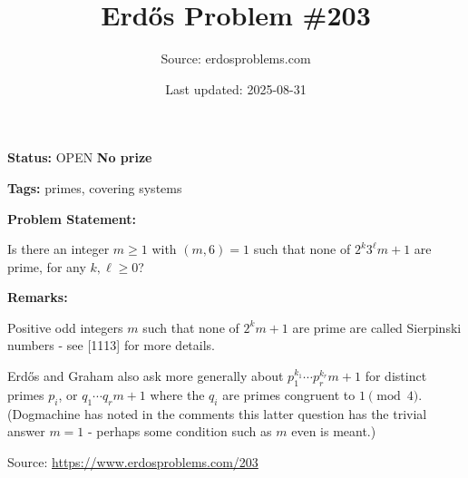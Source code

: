 \documentclass{article}
\title{Erd\H{o}s Problem \#203}
\date{Last updated: 2025-08-31}
\author{Source: erdosproblems.com}
\begin{document}
\maketitle

\noindent\textbf{Status:} OPEN \quad \textbf{No prize}

\noindent\textbf{Tags:} primes, covering systems

\medskip
\noindent\textbf{Problem Statement:}

Is there an integer $m\geq 1$ with $(m,6)=1$ such that none of $2^k3^\ell m+1$ are prime, for any $k,\ell\geq 0$?

\bigskip
\noindent\textbf{Remarks:}

Positive odd integers $m$ such that none of $2^km+1$ are prime are called Sierpinski numbers - see [1113] for more details.

Erd\H{o}s and Graham also ask more generally about $p_1^{k_1}\cdots p_r^{k_r}m+1$ for distinct primes $p_i$, or $q_1\cdots q_rm+1$ where the $q_i$ are primes congruent to $1\pmod{4}$. (Dogmachine has noted in the comments this latter question has the trivial answer $m=1$ - perhaps some condition such as $m$ even is meant.)

\bigskip
\noindent\small{Source: \url{https://www.erdosproblems.com/203}}
\end{document}

